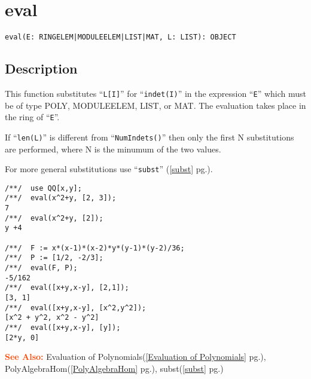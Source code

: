 \documentclass[a4paper]{mybook}
\newenvironment{command}{}{} %
\newcommand\SeeAlso{\par\textcolor{OrangeRed}{\textbf{\large See Also: }}}
\begin{document}
\section{eval}
\label{eval}
\begin{command} %


\begin{Verbatim}[label=syntax, rulecolor=\color{MidnightBlue},
frame=single]
eval(E: RINGELEM|MODULEELEM|LIST|MAT, L: LIST): OBJECT
\end{Verbatim}


\subsection*{Description}

This function substitutes ``\verb&L[I]&'' for ``\verb&indet(I)&'' in the
expression ``\verb&E&'' which must be of type POLY, MODULEELEM, LIST, or MAT.
The evaluation takes place in the ring of ``\verb&E&''.
\par 
If ``\verb&len(L)&'' is different from ``\verb&NumIndets()&'' then only
the first N substitutions are performed, where N is the minumum of the
two values.
\par 
For more general substitutions use ``\verb&subst&'' (\ref{subst} pg.\pageref{subst}).
\begin{Verbatim}[label=example, rulecolor=\color{PineGreen}, frame=single]
/**/  use QQ[x,y];
/**/  eval(x^2+y, [2, 3]);
7
/**/  eval(x^2+y, [2]);
y +4

/**/  F := x*(x-1)*(x-2)*y*(y-1)*(y-2)/36;
/**/  P := [1/2, -2/3];
/**/  eval(F, P);
-5/162
/**/  eval([x+y,x-y], [2,1]);
[3, 1]
/**/  eval([x+y,x-y], [x^2,y^2]);
[x^2 + y^2, x^2 - y^2]
/**/  eval([x+y,x-y], [y]);
[2*y, 0]
\end{Verbatim}


\SeeAlso %
  Evaluation of Polynomials(\ref{Evaluation of Polynomials} pg.\pageref{Evaluation of Polynomials}), 
    PolyAlgebraHom(\ref{PolyAlgebraHom} pg.\pageref{PolyAlgebraHom}), 
    subst(\ref{subst} pg.\pageref{subst})
\end{command} %
\end{document}
